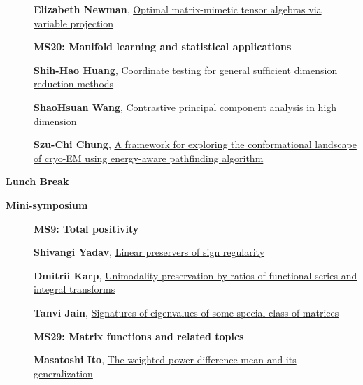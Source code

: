 \documentclass[ILAS2025-program.tex]{subfiles}
\begin{document}
\begin{description}
\begin{description}
        \item[] \hypertarget{up0039}{}\textbf{Elizabeth Newman}, \hyperlink{down0039}{Optimal matrix-mimetic tensor algebras via variable projection
}
        \end{description}
    \begin{description}
    \item[] {\color{mstitle}\textbf{MS20: Manifold learning and statistical applications}} 
    \item[] \hypertarget{up0040}{}\textbf{Shih-Hao Huang}, \hyperlink{down0040}{Coordinate testing for general sufficient dimension reduction methods}
        \item[] \hypertarget{up0041}{}\textbf{ShaoHsuan Wang}, \hyperlink{down0041}{Contrastive principal component analysis in high dimension}
        \item[] \hypertarget{up0042}{}\textbf{Szu-Chi Chung}, \hyperlink{down0042}{A framework for exploring the conformational landscape of cryo-EM using energy-aware pathfinding algorithm}
        \end{description}
    \item[\info{12:30\textrm{--}14:00}] \textbf{Lunch Break} \info{}
    \item[\info{14:00\textrm{--}15:30}] \textbf{Mini-symposium} 
    \begin{description}
    \item[] {\color{mstitle}\textbf{MS9: Total positivity}} 
    \item[] \hypertarget{up0043}{}\textbf{Shivangi Yadav}, \hyperlink{down0043}{Linear preservers of sign regularity}
        \item[] \hypertarget{up0044}{}\textbf{Dmitrii Karp}, \hyperlink{down0044}{Unimodality preservation by ratios of functional series and integral transforms}
        \item[] \hypertarget{up0045}{}\textbf{Tanvi Jain}, \hyperlink{down0045}{Signatures of eigenvalues of some special class of matrices}
        \end{description}
    \begin{description}
    \item[] {\color{mstitle}\textbf{MS29: Matrix functions and related topics}} 
    \item[] \hypertarget{up0046}{}\textbf{Masatoshi Ito}, \hyperlink{down0046}{The weighted power difference mean and its generalization}

\end{description}
\end{description}
\end{document}
